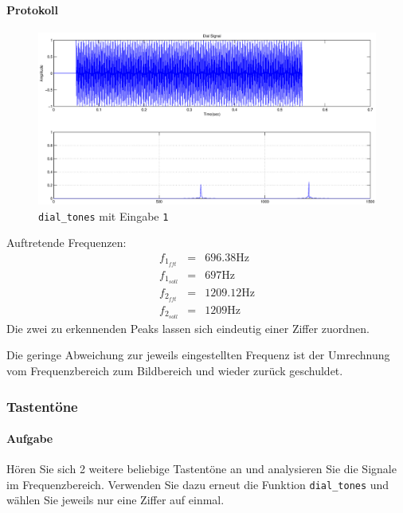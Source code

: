 \documentclass[10pt]{scrreprt}
\begin{document}
        \paragraph{Protokoll}
        \begin{center}
            \begin{figure}[H]
                \includegraphics[width=\textwidth]{img4341}
              \caption{\texttt{dial\_tones} mit Eingabe \texttt{1}}
            \end{figure}
        \end{center}
        Auftretende Frequenzen:
        \begin{eqnarray*}
            f_{1_{fft}} &=& 696.38 \si{\hertz}\\
            f_{1_{soll}} &=& 697\si{\hertz}\\
            f_{2_{fft}} &=& 1209.12\si{\hertz}\\
            f_{2_{soll}} &=& 1209\si{\hertz}
        \end{eqnarray*}
        Die zwei zu erkennenden Peaks lassen sich eindeutig einer Ziffer zuordnen.

        Die geringe Abweichung zur jeweils eingestellten Frequenz ist der Umrechnung
        vom Frequenzbereich zum Bildbereich und wieder zurück geschuldet.

        \subsubsection{Tastentöne}
        \paragraph{Aufgabe}
        Hören Sie sich 2 weitere beliebige Tastentöne an und analysieren Sie die Signale im
        Frequenzbereich. Verwenden Sie dazu erneut die Funktion \texttt{dial\_tones} und wählen
        Sie jeweils nur eine Ziffer auf einmal.
\end{document}
